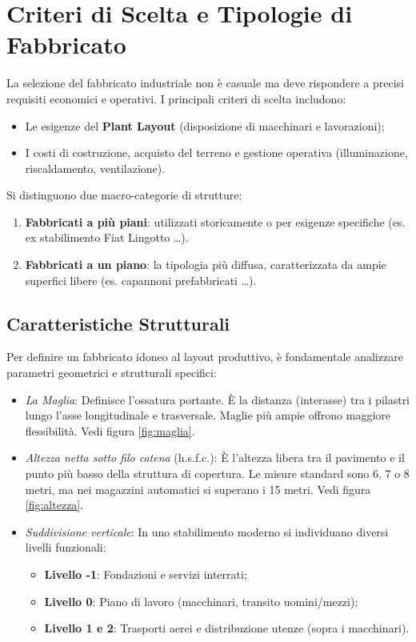%
%
\section{Criteri di Scelta e Tipologie di Fabbricato}
La selezione del fabbricato industriale non è casuale ma deve rispondere a precisi requisiti economici e operativi. I principali criteri di scelta includono:
\begin{itemize}
    \item Le esigenze del \textbf{Plant Layout} (disposizione di macchinari e lavorazioni);
    \item I costi di costruzione, acquisto del terreno e gestione operativa (illuminazione, riscaldamento, ventilazione).
\end{itemize}
Si distinguono due macro-categorie di strutture:
\begin{enumerate}
    \item \textbf{Fabbricati a più piani}: utilizzati storicamente o per esigenze specifiche (es. ex stabilimento Fiat Lingotto \dots).
    \item \textbf{Fabbricati a un piano}: la tipologia più diffusa, caratterizzata da ampie superfici libere (es. capannoni prefabbricati \dots).
\end{enumerate}

%
\subsection{Caratteristiche Strutturali}
Per definire un fabbricato idoneo al layout produttivo, è fondamentale analizzare parametri geometrici e strutturali specifici:
\begin{itemize}
    \item \emph{La Maglia}: Definisce l'ossatura portante. È la distanza (interasse) tra i pilastri lungo l'asse longitudinale e trasversale. Maglie più ampie offrono maggiore flessibilità. Vedi figura \ref{fig:maglia}.
    \item \emph{Altezza netta sotto filo catena} (h.s.f.c.): È l'altezza libera tra il pavimento e il punto più basso della struttura di copertura. Le misure standard sono 6, 7 o 8 metri, ma nei magazzini automatici si superano i 15 metri. Vedi figura \ref{fig:altezza}.
    \item \emph{Suddivisione verticale}: In uno stabilimento moderno si individuano diversi livelli funzionali:
          \begin{itemize}
              \item \textbf{Livello -1}: Fondazioni e servizi interrati;
              \item \textbf{Livello 0}: Piano di lavoro (macchinari, transito uomini/mezzi);
              \item \textbf{Livello 1 e 2}: Trasporti aerei e distribuzione utenze (sopra i macchinari).
          \end{itemize}
\end{itemize}

